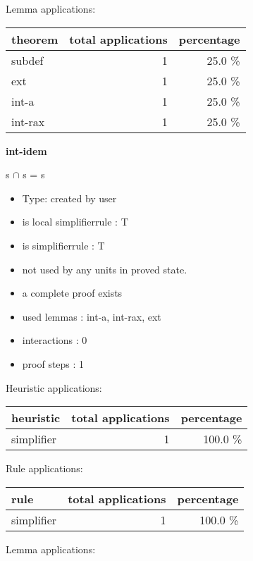 \documentclass[a4paper]{article}
\begin{document}
Lemma applications:

\begin{supertabular}{l|r|r}
theorem	        & total applications & percentage \\ \hline
subdef & 1 & 25.0 \% \\
ext & 1 & 25.0 \% \\
int-a & 1 & 25.0 \% \\
int-rax & 1 & 25.0 \% \\

\end{supertabular}
\pagebreak

{\LARGE\bf int-idem}\label{lemma-int-idem}

\medskip

 \Fol s $\cap$ s = s

\begin{itemize}

\item Type: created by user

\item is local simplifierrule : T
\item is simplifierrule : T
\item not used by any units in proved state.
\item       a complete proof exists
\item       used lemmas  : int-a, int-rax, ext
\item       interactions : 0
\item       proof steps  : 1
\end{itemize}

\medskip


Heuristic applications:

\begin{supertabular}{l|r|r}
heuristic	& total applications & percentage \\ \hline
simplifier & 1 & 100.0 \% \\

\end{supertabular}

Rule applications:

\begin{supertabular}{l|r|r}
rule	        & total applications & percentage \\ \hline
simplifier & 1 & 100.0 \% \\

\end{supertabular}

Lemma applications:
\end{document}
